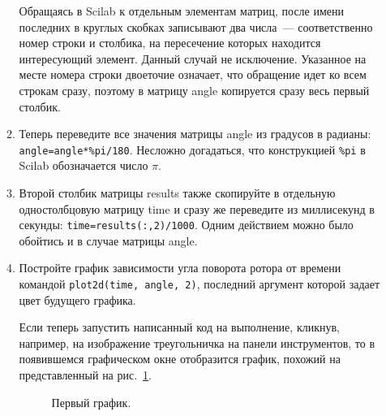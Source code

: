 \documentclass[12pt,a4paper,openany]{extarticle}
\begin{document}
\begin{enumerate}
\begin{enumerate}
Обращаясь в Scilab к отдельным элементам матриц, после имени последних в круглых скобках записывают два числа~--- соответственно номер строки и столбика, на пересечение которых находится интересующий элемент. 
Данный случай не исключение. 
Указанное на месте номера строки двоеточие означает, что обращение идет ко всем строкам сразу, поэтому в матрицу angle копируется сразу весь первый столбик.
\item Теперь переведите все значения матрицы angle из градусов в радианы: \verb|angle=angle*%pi/180|. 
Несложно догадаться, что конструкцией \verb|%pi| в Scilab обозначается число $\pi$.
\item Второй столбик матрицы results также скопируйте в отдельную одностолбцовую матрицу time и сразу же переведите из миллисекунд в секунды: \verb|time=results(:,2)/1000|. 
Одним действием можно было обойтись и в случае матрицы angle.
\item Постройте график зависимости угла поворота ротора от времени командой \verb|plot2d(time, angle, 2)|, последний аргумент которой задает цвет будущего графика.

Если теперь запустить написанный код на выполнение, кликнув, например, на изображение треугольничка на панели инструментов, то в появившемся графическом окне отобразится график, похожий на представленный на рис.~\ref{first_graph}. 

\begin{figure}[h]
	\noindent{}
	\caption{Первый график.}
	\label{first_graph}
\end{figure}


\end{enumerate}
\end{enumerate}
\end{document}
